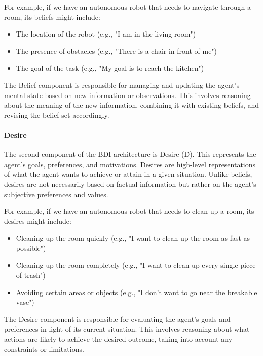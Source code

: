 For example, if we have an autonomous robot that needs to navigate through a room,
its beliefs might include:
\begin{itemize}[noitemsep]
  \item The location of the robot (e.g., "I am in the living room")

  \item The presence of obstacles (e.g., "There is a chair in front of me")

  \item The goal of the task (e.g., "My goal is to reach the kitchen")
\end{itemize}
The Belief component is responsible for managing and updating the agent's mental
state based on new information or observations. This involves reasoning about
the meaning of the new information, combining it with existing beliefs, and
revising the belief set accordingly.

\paragraph{Desire}
The second component of the BDI architecture is Desire (D). This represents the
agent's goals, preferences, and motivations. Desires are high-level representations
of what the agent wants to achieve or attain in a given situation. Unlike
beliefs, desires are not necessarily based on factual information but rather on the
agent's subjective preferences and values.

For example, if we have an autonomous robot that needs to clean up a room, its desires
might include:

\begin{itemize}[noitemsep]
  \item Cleaning up the room quickly (e.g., "I want to clean up the room as fast
    as possible")

  \item Cleaning up the room completely (e.g., "I want to clean up every single piece
    of trash")

  \item Avoiding certain areas or objects (e.g., "I don't want to go near the breakable
    vase")
\end{itemize}
The Desire component is responsible for evaluating the agent's goals and preferences
in light of its current situation. This involves reasoning about what actions
are likely to achieve the desired outcome, taking into account any constraints or
limitations.

